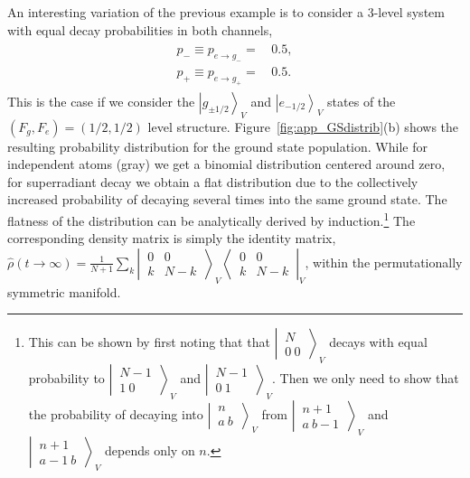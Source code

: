 \documentclass[aps,prx,superscriptaddress,twocolumn,notitlepage,nofootinbib,longbibliography]{revtex4-2}
\newcommand{\ket}[1]{\left|#1\right>}
\begin{document}
An interesting variation of the previous example is to consider a 3-level system with equal decay probabilities in both channels, 
\begin{align}
\begin{aligned}
	p_- \equiv p_{e \rightarrow g_-} =&\, 0.5, \\
	p_+ \equiv p_{e \rightarrow g_+} =&\, 0.5.
\end{aligned}
\label{eq:decays_6l_1/21/2_app}
\end{align}
This is the case if we consider the $\ket{g_{\pm1/2}}_V$ and $\ket{e_{-1/2}}_V$ states of the $(F_g,F_e)=(1/2,1/2)$ level structure. Figure~\ref{fig:app_GSdistrib}(b) shows the resulting probability distribution for the ground state population. While for independent atoms (gray) we get a binomial distribution centered around zero, for superradiant decay we obtain a flat distribution due to the collectively increased probability of decaying several times into the same ground state. The flatness of the distribution can be analytically derived by induction.\footnote{This can be shown by first noting that that $\left|\, \begin{smallmatrix} N \\  0\ 0  \end{smallmatrix} \,\right\rangle_V$ decays with equal probability to $\left|\, \begin{smallmatrix} N-1 \\  1\ 0  \end{smallmatrix} \,\right\rangle_V$ and $\left|\, \begin{smallmatrix} N-1 \\  0\ 1  \end{smallmatrix} \,\right\rangle_V$. Then we only need to show that the probability of decaying into $\left|\, \begin{smallmatrix} n \\  a\ b  \end{smallmatrix} \,\right\rangle_V$ from $\left|\, \begin{smallmatrix} n+1 \\  a\ b-1  \end{smallmatrix} \,\right\rangle_V$ and $\left|\, \begin{smallmatrix} n+1 \\  a-1\ b  \end{smallmatrix} \,\right\rangle_V$ depends only on $n$.}
The corresponding density matrix is simply the identity matrix, $\hat\rho(t\rightarrow \infty) = \frac{1}{N+1} \sum_k \left|\, \begin{smallmatrix} 0 & 0 \\  k & N-k  \end{smallmatrix} \,\right\rangle_V \left\langle\, \begin{smallmatrix} 0 & 0 \\  k & N-k  \end{smallmatrix} \,\right|_V$, within the permutationally symmetric manifold.
\end{document}
